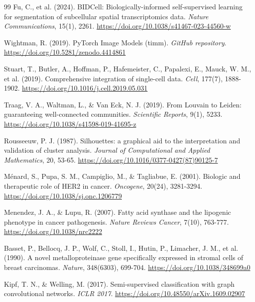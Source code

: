 \documentclass[11pt, a4paper]{article}
\begin{document}
\begin{thebibliography}{99}
 Fu, C., et al. (2024). BIDCell: Biologically-informed self-supervised learning for segmentation of subcellular spatial transcriptomics data. \textit{Nature Communications}, 15(1), 2261. \href{https://doi.org/10.1038/s41467-023-44560-w}{https://doi.org/10.1038/s41467-023-44560-w}

 Wightman, R. (2019). PyTorch Image Models (timm). \textit{GitHub repository}. \href{https://doi.org/10.5281/zenodo.4414861}{https://doi.org/10.5281/zenodo.4414861}

 Stuart, T., Butler, A., Hoffman, P., Hafemeister, C., Papalexi, E., Mauck, W. M., et al. (2019). Comprehensive integration of single-cell data. \textit{Cell}, 177(7), 1888-1902. \href{https://doi.org/10.1016/j.cell.2019.05.031}{https://doi.org/10.1016/j.cell.2019.05.031}

 Traag, V. A., Waltman, L., \& Van Eck, N. J. (2019). From Louvain to Leiden: guaranteeing well-connected communities. \textit{Scientific Reports}, 9(1), 5233. \href{https://doi.org/10.1038/s41598-019-41695-z}{https://doi.org/10.1038/s41598-019-41695-z}

 Rousseeuw, P. J. (1987). Silhouettes: a graphical aid to the interpretation and validation of cluster analysis. \textit{Journal of Computational and Applied Mathematics}, 20, 53-65. \href{https://doi.org/10.1016/0377-0427(87)90125-7}{https://doi.org/10.1016/0377-0427(87)90125-7}

 Ménard, S., Pupa, S. M., Campiglio, M., \& Tagliabue, E. (2001). Biologic and therapeutic role of HER2 in cancer. \textit{Oncogene}, 20(24), 3281-3294. \href{https://doi.org/10.1038/sj.onc.1206779}{https://doi.org/10.1038/sj.onc.1206779}

 Menendez, J. A., \& Lupu, R. (2007). Fatty acid synthase and the lipogenic phenotype in cancer pathogenesis. \textit{Nature Reviews Cancer}, 7(10), 763-777. \href{https://doi.org/10.1038/nrc2222}{https://doi.org/10.1038/nrc2222}

 Basset, P., Bellocq, J. P., Wolf, C., Stoll, I., Hutin, P., Limacher, J. M., et al. (1990). A novel metalloproteinase gene specifically expressed in stromal cells of breast carcinomas. \textit{Nature}, 348(6303), 699-704. \href{https://doi.org/10.1038/348699a0}{https://doi.org/10.1038/348699a0}

 Kipf, T. N., \& Welling, M. (2017). Semi-supervised classification with graph convolutional networks. \textit{ICLR 2017}. \href{https://doi.org/10.48550/arXiv.1609.02907}{https://doi.org/10.48550/arXiv.1609.02907}


\end{thebibliography}
\end{document}
